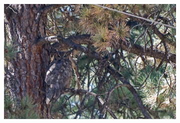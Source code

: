 \documentclass[a4paper,12pt]{ctexart}
\begin{document}
\begin{figure}[h!]
    \centering
    \begin{subfigure}{0.4\textwidth}
        \centering
        \includegraphics[width=\linewidth]{figures/COD10K_demo1/COD10K_demo1_ori.png}
    \end{subfigure} \\


\end{figure}
\end{document}

